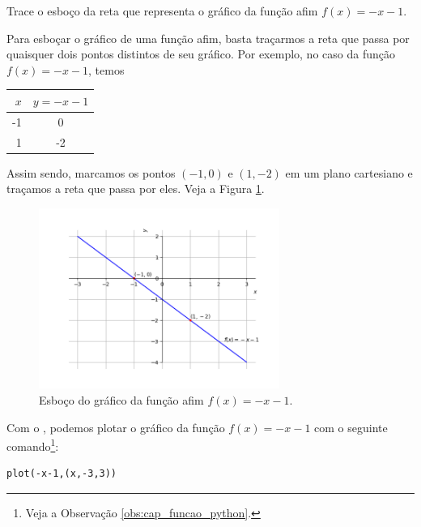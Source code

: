 \begin{exeresol}
Trace o esboço da reta que representa o gráfico da função afim $f(x) = -x-1$.  
\end{exeresol}
\begin{resol}
  Para esboçar o gráfico de uma função afim, basta traçarmos a reta que passa por quaisquer dois pontos distintos de seu gráfico. Por exemplo, no caso da função $f(x) = -x -1$, temos
  \begin{center}
  \begin{tabular}[H]{r|c}
    $x$ & $y = -x-1$\\\hline
    -1  & 0\\
    1   & -2\\\hline
  \end{tabular}
\end{center}
Assim sendo, marcamos os pontos $(-1, 0)$ e $(1, -2)$ em um plano cartesiano e traçamos a reta que passa por eles. Veja a Figura \ref{fig:exeresol_funafim_grafico}.

\begin{figure}[H]
  \centering
  \includegraphics[width=0.7\textwidth]{./cap_funcao/dados/fig_exeresol_funafim_grafico/fig_exeresol_funafim_grafico}
  \caption{Esboço do gráfico da função afim $f(x)=-x-1$.}
  \label{fig:exeresol_funafim_grafico}
\end{figure}

\ifispython
Com o \sympy, podemos plotar o gráfico da função $f(x)=-x-1$ com o seguinte comando\footnote{Veja a Observação \ref{obs:cap_funcao_python}.}:
\begin{verbatim}
plot(-x-1,(x,-3,3))
\end{verbatim}
\fi
\end{resol}

